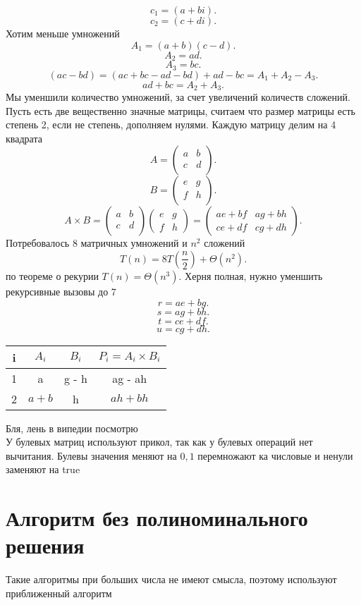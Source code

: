 \documentclass[14pt]{extarticle}
\begin{document}
\[
c_1 = (a + bi )
.\] 
\[
c_2 = (c + di)
.\] 
Хотим меньше умножений
\[
A_1 = (a + b)(c - d)
.\] 
\[
A_2 = ad
.\] 
\[
A_3 = bc
.\] 
\[
    (ac - bd) = (ac + bc - ad - bd) + ad - bc = A_1 + A_2 - A_3
.\] 
\[
ad + bc = A_2 + A_3
.\] 
Мы уменшили количество умножений, за счет увеличений количеств сложений.\\
Пусть есть две вещественно значные матрицы, считаем что размер матрицы есть степень 2, если не степень, дополняем нулями.
Каждую матрицу делим на 4 квадрата
\[
A = \begin{pmatrix} 
    a & b\\
    c& d\\
\end{pmatrix} 
.\] 
\[
B = \begin{pmatrix} 
    e & g \\
    f & h\\
\end{pmatrix} 
.\] 
\[
A \times B = 
\begin{pmatrix} 
    a & b\\
    c & d\\
\end{pmatrix} 
\begin{pmatrix} 
    e & g\\
    f & h
\end{pmatrix} 
=
\begin{pmatrix} 
    ae + bf & ag + bh\\ 
    ce + df & cg + dh
\end{pmatrix} 
.\] 
Потребовалось 8 матричных умножений и $n^2$ сложений
\[
T(n) = 8 T(\frac{n}{2}) + \Theta(n^2)
.\] 
по теореме о рекурии $T(n) = \Theta(n^{3})$. Херня полная, нужно уменшить рекурсивные вызовы до 7
\[
r = ae + bg
.\] 
\[
s = ag + bh
.\] 
\[
t = ce + df
.\] 
\[
u = cg +dh
.\] 
\begin{tabular}{|c|c|c|c}
    \hline
    i & $A_{i}$ & $B_{i}$ & $P_{i} = A_{i} \times B_{i}$ \\
    \hline
    1 & a & g - h & ag - ah\\
    2 & $a+b$ & h &  $ah + bh$
\end{tabular}
Бля, лень в випедии посмотрю\\
У булевых матриц используют прикол, так как у булевых операций нет вычитания. Булевы значения меняют на $0,1$ перемножают ка числовые и ненули заменяют на true
\section{Алгоритм без полиноминального решения}
Такие алгоритмы при больших числа не имеют смысла, поэтому используют приближенный алгоритм
\end{document}
